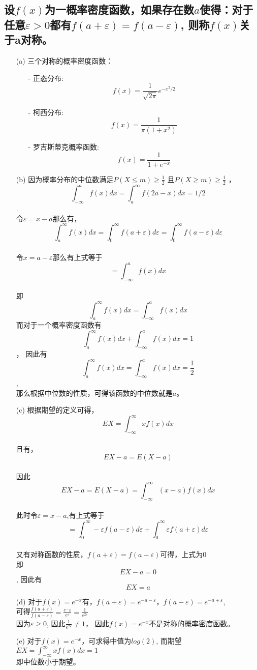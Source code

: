 \documentclass [12pt]{article}
\begin{document}
\begin{CJK*}{GBK}{kai}
\section{ 设$f(x)$为一概率密度函数，如果存在数$a$使得：对于任意$\varepsilon > 0$都有$f(a+\varepsilon)=f(a-\varepsilon)$, 则称$f(x)$关于a对称。}
  \begin{enumerate}
  \item[(a)] 三个对称的概率密度函数：
 	 \begin{itemize}
		\item[-] 正态分布:$$f(x)=\frac{1}{\sqrt{2\pi}}e^{-x^2/2}$$
		\item[-] 柯西分布:$$f(x)=\frac{1}{\pi(1+x^2)}$$
		\item[-] 罗吉斯蒂克概率函数: $$f(x)=\frac{1}{1+e^{-x}}$$
	\end{itemize}

  	
  \item[(b)] 因为概率分布的中位数满足$P(X \le m) \ge \frac{1}{2}$ 且$P(X \ge m) \ge \frac{1}{2}$ ，$$\int_{-\infty}^af(x)dx=\int_a^{\infty}f(2a-x)dx=1/2$$.\\
  	令$\varepsilon=x-a$那么有，$$\int_{a}^{\infty}f(x)dx=\int_{0}^{\infty}f(a+\varepsilon)d\varepsilon=\int_{0}^{\infty}f(a-\varepsilon)d\varepsilon$$\\
	令$x=a-\varepsilon$那么有上式等于$$=\int_{-\infty}^{a}f(x)dx$$\\
	即$$\int_{a}^{\infty}f(x)dx=\int_{-\infty}^{a}f(x)dx$$
	而对于一个概率密度函数有$$\int_{a}^{\infty}f(x)dx + \int_{-\infty}^{a}f(x)dx=1$$，
	因此有$$\int_{a}^{\infty}f(x)dx=\int_{-\infty}^{a}f(x)dx=\frac{1}{2}$$,\\
	那么根据中位数的性质，可得该函数的中位数就是$a$。
  \item[(c)] 根据期望的定义可得，$$EX=\int_{-\infty}^{\infty}xf(x)dx$$\\
  	且有，$$EX- a=E(X-a)$$\\
	因此$$EX- a=E(X-a)=\int_{-\infty}^{\infty}(x-a)f(x)dx$$\\
	此时令$\varepsilon=x-a$,有上式等于$$=\int_{0}^{\infty}-\varepsilon f(a-\varepsilon)d\varepsilon+\int_{0}^{\infty}\varepsilon f(a+\varepsilon)d\varepsilon$$\\
  	又有对称函数的性质，$f(a+\varepsilon)=f(a-\varepsilon)$可得，上式为0\\
	即$$EX- a=0$$, 因此有$$EX= a$$
  \item[(d)] 对于$f(x)=e^{-x}$有，$f(a+\varepsilon)=e^{-a-\varepsilon}$，$f(a-\varepsilon)=e^{-a+\varepsilon}$,\\
  	可得$\frac{f(a+\varepsilon)}{f(a-\varepsilon)}=\frac{e^-\varepsilon}{e^\varepsilon}=\frac{1}{e^{2\varepsilon}}$\\
	因为$\varepsilon \ge 0$, 因此$\frac{1}{e^{2\varepsilon}} \ne 1 $， 因此$f(x)=e^{-x}$不是对称的概率密度函数。
 \item[(e)] 对于$f(x)=e^{-x}$，可求得中值为$log(2)$, 而期望$EX=\int_{-\infty}^\infty{ xf(x)dx}=1$\\
 	即中位数小于期望。
\end{enumerate}







\end{CJK*}
\end{document}
